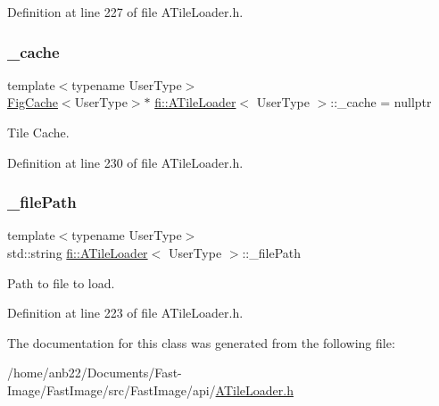 Definition at line 227 of file A\+Tile\+Loader.\+h.

\mbox{\label{classfi_1_1ATileLoader_a35c8ba6cc53333935c03d822b24095b9}} 
\subsubsection{\texorpdfstring{\+\_\+cache}{\_cache}}
{\footnotesize\ttfamily template$<$typename User\+Type$>$ \\
\hyperlink{classfi_1_1FigCache}{Fig\+Cache}$<$User\+Type$>$$\ast$ \hyperlink{classfi_1_1ATileLoader}{fi\+::\+A\+Tile\+Loader}$<$ User\+Type $>$\+::\+\_\+cache = nullptr\hspace{0.3cm}{\ttfamily [private]}}



Tile Cache. 



Definition at line 230 of file A\+Tile\+Loader.\+h.

\mbox{\label{classfi_1_1ATileLoader_aa96fb4d90ac425c4b670b23f6ebe49f6}} 
\subsubsection{\texorpdfstring{\+\_\+file\+Path}{\_filePath}}
{\footnotesize\ttfamily template$<$typename User\+Type$>$ \\
std\+::string \hyperlink{classfi_1_1ATileLoader}{fi\+::\+A\+Tile\+Loader}$<$ User\+Type $>$\+::\+\_\+file\+Path\hspace{0.3cm}{\ttfamily [protected]}}



Path to file to load. 



Definition at line 223 of file A\+Tile\+Loader.\+h.



The documentation for this class was generated from the following file\+:\begin{DoxyCompactItemize}
\item 
/home/anb22/\+Documents/\+Fast-\/\+Image/\+Fast\+Image/src/\+Fast\+Image/api/\hyperlink{ATileLoader_8h}{A\+Tile\+Loader.\+h}\end{DoxyCompactItemize}
